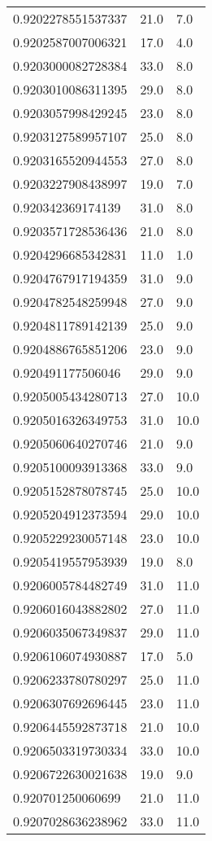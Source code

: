 \begin{center}
\begin{supertabular}[H]{p{0.30\textwidth}p{0.05\textwidth}p{0.05\textwidth}}
0.9202278551537337 & 21.0 & 7.0 \\ 
0.9202587007006321 & 17.0 & 4.0 \\ 
0.9203000082728384 & 33.0 & 8.0 \\ 
0.9203010086311395 & 29.0 & 8.0 \\ 
0.9203057998429245 & 23.0 & 8.0 \\ 
0.9203127589957107 & 25.0 & 8.0 \\ 
0.9203165520944553 & 27.0 & 8.0 \\ 
0.9203227908438997 & 19.0 & 7.0 \\ 
0.920342369174139 & 31.0 & 8.0 \\ 
0.9203571728536436 & 21.0 & 8.0 \\ 
0.9204296685342831 & 11.0 & 1.0 \\ 
0.9204767917194359 & 31.0 & 9.0 \\ 
0.9204782548259948 & 27.0 & 9.0 \\ 
0.9204811789142139 & 25.0 & 9.0 \\ 
0.9204886765851206 & 23.0 & 9.0 \\ 
0.920491177506046 & 29.0 & 9.0 \\ 
0.9205005434280713 & 27.0 & 10.0 \\ 
0.9205016326349753 & 31.0 & 10.0 \\ 
0.9205060640270746 & 21.0 & 9.0 \\ 
0.9205100093913368 & 33.0 & 9.0 \\ 
0.9205152878078745 & 25.0 & 10.0 \\ 
0.9205204912373594 & 29.0 & 10.0 \\ 
0.9205229230057148 & 23.0 & 10.0 \\ 
0.9205419557953939 & 19.0 & 8.0 \\ 
0.9206005784482749 & 31.0 & 11.0 \\ 
0.9206016043882802 & 27.0 & 11.0 \\ 
0.9206035067349837 & 29.0 & 11.0 \\ 
0.9206106074930887 & 17.0 & 5.0 \\ 
0.9206233780780297 & 25.0 & 11.0 \\ 
0.9206307692696445 & 23.0 & 11.0 \\ 
0.9206445592873718 & 21.0 & 10.0 \\ 
0.9206503319730334 & 33.0 & 10.0 \\ 
0.9206722630021638 & 19.0 & 9.0 \\ 
0.920701250060699 & 21.0 & 11.0 \\ 
0.9207028636238962 & 33.0 & 11.0 \\ 

\end{supertabular}
\end{center}
